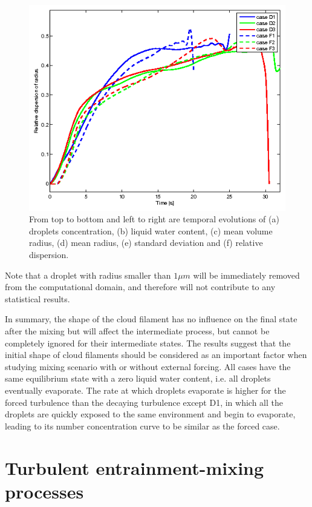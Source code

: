 \documentclass[draft,jgrga]{AGUTeX}
\begin{document}
\begin{article}
\begin{figure}[!htbp]
\includegraphics[width=0.48\linewidth]{Figures/dsp_radius}
\caption{From top to bottom and left to right are temporal evolutions of (a) droplets concentration, (b) liquid water content, (c) mean volume radius, (d) mean radius, (e) standard deviation and (f) relative dispersion.}\label{fig:temporal_variation} 
\end{figure}

Note that a droplet with radius smaller than $1\mu m$ will be immediately removed from the computational domain, and therefore will not contribute to any statistical results.

In summary, the shape of the cloud filament has no influence on the final state after the mixing but will affect the intermediate process, but cannot be completely ignored for their intermediate states. The results suggest that the initial shape of cloud filaments should be considered as an important factor when studying mixing scenario with or without external forcing. All cases have the same equilibrium state with a zero liquid water content, i.e. all droplets eventually evaporate. The rate at which droplets evaporate is higher for the forced turbulence than the decaying turbulence except D1, in which all the droplets are quickly exposed to the same environment and begin to evaporate, leading to its number concentration curve to be similar as the forced case.

\section{Turbulent entrainment-mixing processes}\label{mixing_processes}


\end{article}
\end{document}
